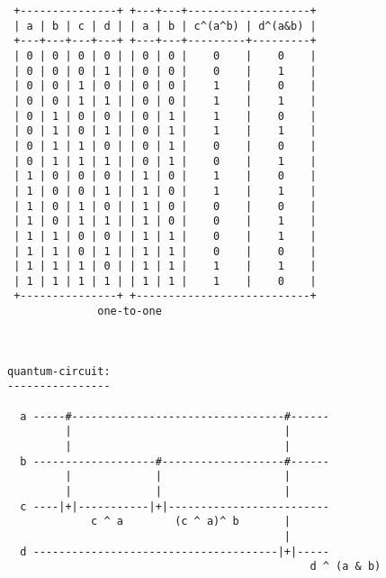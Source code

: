 \documentclass{article}
\begin{document}
\begin{verbatim}
 +---------------+ +---+---+-------------------+
 | a | b | c | d | | a | b | c^(a^b) | d^(a&b) |
 +---+---+---+---+ +---+---+---------+---------+
 | 0 | 0 | 0 | 0 | | 0 | 0 |    0    |    0    |
 | 0 | 0 | 0 | 1 | | 0 | 0 |    0    |    1    |
 | 0 | 0 | 1 | 0 | | 0 | 0 |    1    |    0    |
 | 0 | 0 | 1 | 1 | | 0 | 0 |    1    |    1    |
 | 0 | 1 | 0 | 0 | | 0 | 1 |    1    |    0    |
 | 0 | 1 | 0 | 1 | | 0 | 1 |    1    |    1    |
 | 0 | 1 | 1 | 0 | | 0 | 1 |    0    |    0    |
 | 0 | 1 | 1 | 1 | | 0 | 1 |    0    |    1    |
 | 1 | 0 | 0 | 0 | | 1 | 0 |    1    |    0    |
 | 1 | 0 | 0 | 1 | | 1 | 0 |    1    |    1    |
 | 1 | 0 | 1 | 0 | | 1 | 0 |    0    |    0    |
 | 1 | 0 | 1 | 1 | | 1 | 0 |    0    |    1    |
 | 1 | 1 | 0 | 0 | | 1 | 1 |    0    |    1    |
 | 1 | 1 | 0 | 1 | | 1 | 1 |    0    |    0    |
 | 1 | 1 | 1 | 0 | | 1 | 1 |    1    |    1    |
 | 1 | 1 | 1 | 1 | | 1 | 1 |    1    |    0    |
 +---------------+ +---------------------------+
              one-to-one



quantum-circuit:
----------------

  a -----#---------------------------------#------
         |                                 |
         |                                 |
  b -------------------#-------------------#------
         |             |                   |
         |             |                   |
  c ----|+|-----------|+|-------------------------
             c ^ a        (c ^ a)^ b       |
                                           |
  d --------------------------------------|+|-----
                                               d ^ (a & b)


\end{verbatim}
\end{document}
